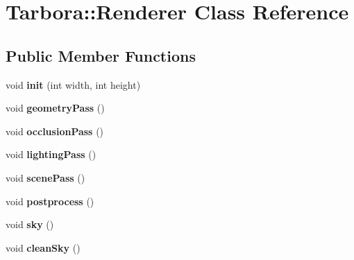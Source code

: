 \hypertarget{classTarbora_1_1Renderer}{}\section{Tarbora\+:\+:Renderer Class Reference}
\label{classTarbora_1_1Renderer}
\subsection*{Public Member Functions}
\begin{DoxyCompactItemize}
\item 
\mbox{\label{classTarbora_1_1Renderer_a29506f41efa278db8b669e210ed2581c}} 
void {\bfseries init} (int width, int height)
\item 
\mbox{\label{classTarbora_1_1Renderer_a2310020440f65d8f63dba5489c1e2708}} 
void {\bfseries geometry\+Pass} ()
\item 
\mbox{\label{classTarbora_1_1Renderer_af2c2f997c48eef597bf85f44f5a3c336}} 
void {\bfseries occlusion\+Pass} ()
\item 
\mbox{\label{classTarbora_1_1Renderer_a6633815ba3aacbe52a22fff5a379215c}} 
void {\bfseries lighting\+Pass} ()
\item 
\mbox{\label{classTarbora_1_1Renderer_a558712318911bf9317027ae4dd67b7d8}} 
void {\bfseries scene\+Pass} ()
\item 
\mbox{\label{classTarbora_1_1Renderer_af953e14785d313d69b6cf2cec5db1caa}} 
void {\bfseries postprocess} ()
\item 
\mbox{\label{classTarbora_1_1Renderer_a606cd2080268c69c9351be92edc1bfd9}} 
void {\bfseries sky} ()
\item 
\mbox{\label{classTarbora_1_1Renderer_aba30e0b537de875b55563026c5bbc477}} 
void {\bfseries clean\+Sky} ()
\item 
\mbox{\label{classTarbora_1_1Renderer_af6db576c64c2307c0bde3d2f2fa37335}} 

\end{DoxyCompactItemize}
